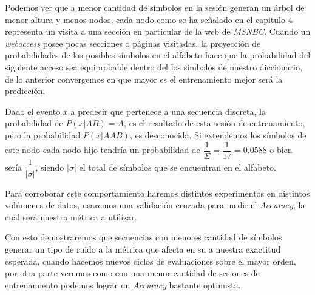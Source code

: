 Podemos ver que a menor cantidad de símbolos en la sesión generan un árbol de menor altura y menos nodos, cada nodo como se ha señalado en el capitulo 4 representa un visita a una sección en particular de la web de \emph{MSNBC}. Cuando un \emph{webaccess} posee  pocas secciones o páginas visitadas, la proyección de probabilidades de los posibles símbolos en el alfabeto hace que la probabilidad del siguiente acceso sea equiprobable dentro del los símbolos de nuestro diccionario, de lo anterior convergemos en que mayor es el entrenamiento mejor será la predicción.

Dado el evento $x$  a predecir que pertenece a una secuencia discreta, la probabilidad de $P( x| AB  ) = A $, es el resultado de esta sesión de entrenamiento, pero la probabilidad $P(x | AAB) $, es desconocida.  Si extendemos los símbolos de este nodo cada nodo hijo tendría un probabilidad de $ \dfrac{1}{\Sigma} = \dfrac{1}{17} = 0.0588 $ o bien sería  $\dfrac{1}{ |\sigma| }$, siendo $|\sigma|$ el total de símbolos que se encuentran en el alfabeto. 

Para corroborar este comportamiento haremos distintos experimentos en distintos volúmenes de datos, usaremos una validación cruzada para medir el \emph{Accuracy}, la cual será nuestra métrica a utilizar.

Con esto demostraremos que secuencias con menores cantidad de símbolos generar un tipo de ruido a la métrica  que afecta en su a nuestra exactitud esperada, cuando hacemos nuevos ciclos de evaluaciones sobre el mayor orden, por otra parte veremos como con una menor cantidad de sesiones de entrenamiento podemos lograr un \emph{Accuracy} bastante optimista.



